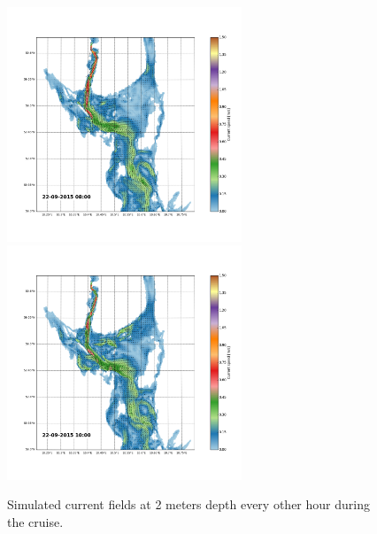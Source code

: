\documentclass[12pt,a4paper,english]{article}
\begin{document}
\begin{figure}[ht]
{}
\centerline{
\includegraphics*[trim=2.0cm 3cm 6.0cm 3.5cm,clip=true,height=7cm]{Python/stromfelt_90}
\includegraphics*[trim=3.7cm 3cm 1.3cm 3.5cm,clip=true,height=7cm]{Python/stromfelt_92}
}
\caption{\small 
Simulated current fields at 2 meters depth every other hour during the cruise.}
\label{fig:Current2}
\end{figure}
\end{document}
